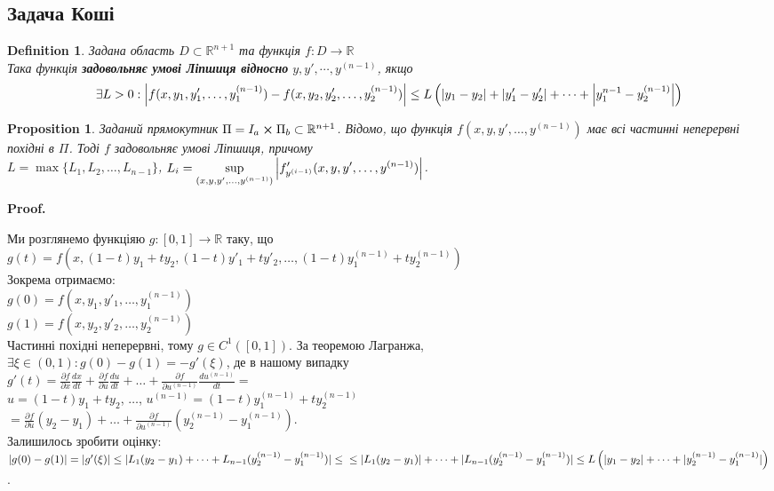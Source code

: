 \documentclass[a4paper, 10pt]{article}
\makeatletter
\def\qed{$\blacksquare$}
\theoremstyle{theoremdd}
\theoremstyle{theoremdd}
\newtheorem{definition}[theorem]{Definition}
\theoremstyle{theoremdd}
\theoremstyle{theoremdd}
\theoremstyle{theoremdd}
\newtheorem{proposition}[theorem]{Proposition}
\theoremstyle{theoremdd}
\theoremstyle{theoremdd}
\theoremstyle{theoremdd}
\renewenvironment{proof}[1][Proof.\\]{\par
\pushQED{\hfill \qed}%
\normalfont \topsep6\p@\@plus6\p@\relax
\trivlist
\item\relax
{\bfseries
#1\@addpunct{.}}\hspace\labelsep\ignorespaces
}{%
\popQED\endtrivlist\@endpefalse
}
\makeatother
\begin{document}
	\subsection{Задача Коші}
	\begin{definition}
 Задана область $D \subset \mathbb{R}^{n+1}$ та функція $f\colon D \to 	\mathbb{R}$\\
	Така функція \textbf{задовольняє умові Ліпшиця відносно} $y,y',\cdots,y^{(n-1)}$, якщо
	\begin{align*}
	\exists L>0: \abs{f(x,y_1, y'_1,\dots, y^{(n-1)}_1) - f(x,y_2, y'_2,\dots, y^{(n-1)}_2)} \leq L\left(\abs{y_1-y_2}+\abs{y'_1-y'_2}+\dots+\abs{y^{n-1}_1-y^{(n-1)}_2}\right)
	\end{align*}	
	\end{definition}
	\begin{proposition}
 Заданий прямокутник $\Pi = I_a \cross \Pi_b \subset \mathbb{R}^{n+1}$. Відомо, що функція $f(x,y,y',\dots,y^{(n-1)})$ має всі частинні неперервні похідні в $\Pi$. Тоді $f$ задовольняє умові Ліпшиця, причому \\ $L=\max\{L_1,L_2, \dots, L_{n-1}\}$, \qquad $\displaystyle L_i = \sup_{(x,y,y',\dots,y^{(n-1)})} \abs{f'_{y^{(i-1)}} (x,y,y',\dots,y^{(n-1)})}$.
	\end{proposition}

	\begin{proof}
	Ми розглянемо функціяю $g\colon [0,1] \to \mathbb{R}$ таку, що \\
	$\displaystyle g(t) = f(x, (1-t)y_1 + ty_2, (1-t)y'_1+ty'_2, \dots, (1-t)y^{(n-1)}_1+ty^{(n-1)}_2)$\\
	Зокрема отримаємо:\\
	$g(0) = f(x,y_1, y'_1, \dots, y^{(n-1)}_1)$\\
	$g(1) = f(x,y_2, y'_2, \dots, y^{(n-1)}_2)$\\
	Частинні похідні неперервні, тому $g \in C^1([0,1])$. За теоремою Лагранжа,\\
	$\exists \xi \in (0,1): g(0) - g(1) = -g'(\xi)$, де в нашому випадку \\
	$\displaystyle g'(t) = \frac{\partial f}{\partial x} \frac{dx}{dt} +  \frac{\partial f}{\partial u} \frac{du}{dt} + \dots +  \frac{\partial f}{\partial u^{(n-1)}} \frac{du^{(n-1)}}{dt} \boxed{=}$\\
	$u = (1-t)y_1+ty_2$, $\dots$, $u^{(n-1)} = (1-t)y^{(n-1)}_1 + ty^{(n-1)}_2$\\
	$\displaystyle \boxed{=} \frac{\partial f}{\partial u} (y_2-y_1) + \dots +  \frac{\partial f}{\partial u^{(n-1)}} (y^{(n-1)}_2-y^{(n-1)}_1)$.\\
	Залишилось зробити оцінку:\\
	$|g(0) - g(1)| = |g'(\xi)| \leq |L_1(y_2-y_1)+\dots+L_{n-1}(y^{(n-1)}_2-y^{(n-1)}_1)| \leq \\ \leq |L_1(y_2-y_1)| +\dots+ |L_{n-1}(y^{(n-1)}_2-y^{(n-1)}_1)| \leq L\left(|y_1-y_2|+\dots+|y^{(n-1)}_2-y^{(n-1)}_1|\right)$. 
\end{proof}
	
\end{document}

